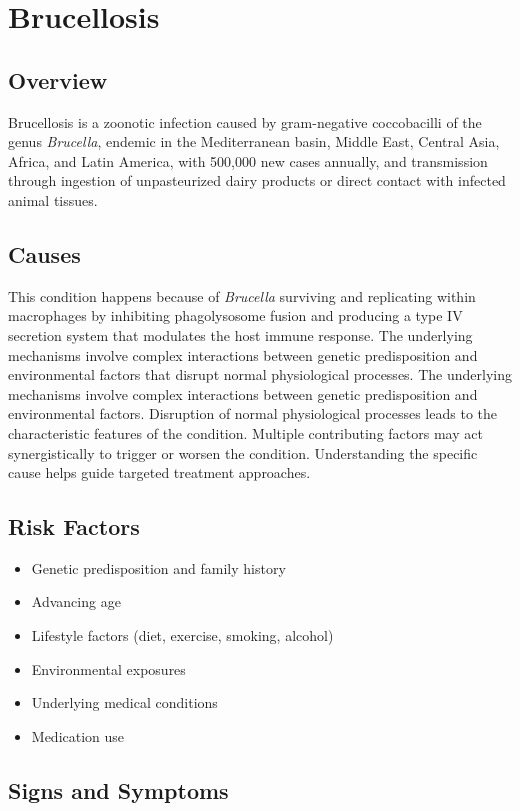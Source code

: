 \chapter{Brucellosis}
\label{sec:Brucellosis}

\section{Overview}
Brucellosis is a zoonotic infection caused by gram-negative coccobacilli of the genus \textit{Brucella}, endemic in the Mediterranean basin, Middle East, Central Asia, Africa, and Latin America, with 500,000 new cases annually, and transmission through ingestion of unpasteurized dairy products or direct contact with infected animal tissues.
\section{Causes}
This condition happens because of \textit{Brucella} surviving and replicating within macrophages by inhibiting phagolysosome fusion and producing a type IV secretion system that modulates the host immune response. The underlying mechanisms involve complex interactions between genetic predisposition and environmental factors that disrupt normal physiological processes. The underlying mechanisms involve complex interactions between genetic predisposition and environmental factors. Disruption of normal physiological processes leads to the characteristic features of the condition. Multiple contributing factors may act synergistically to trigger or worsen the condition. Understanding the specific cause helps guide targeted treatment approaches.
\section{Risk Factors}


\begin{itemize}[noitemsep]
  \item Genetic predisposition and family history
  \item Advancing age
  \item Lifestyle factors (diet, exercise, smoking, alcohol)
  \item Environmental exposures
  \item Underlying medical conditions
  \item Medication use
\end{itemize}
\section{Signs and Symptoms}

